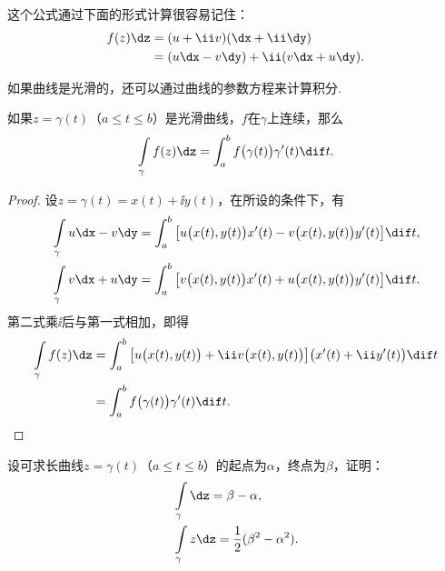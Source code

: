 这个公式通过下面的形式计算很容易记住：
\begin{align*}
f(z)\dz & = (u+\ii v)(\dx+\ii\dy) \\
        & = (u\dx-v\dy)+\ii(v\dx+u\dy).
\end{align*}

如果曲线是光滑的，还可以通过曲线的参数方程来计算积分.
\begin{prop}\label{prop3.1.2}
如果$z=\gamma(t)$（$a\le t\le b$）是光滑曲线，$f$在$\gamma$上连续，那么
\begin{equation}\label{eq3.1.3}
  \int\limits_\gamma f(z)\dz = \int_a^b f\big(\gamma(t)\big)\gamma'(t)\dif t.
\end{equation}
\end{prop}
\begin{proof}
设$z=\gamma(t)=x(t)+\ii y(t)$，在所设的条件下，有
\begin{align*}
  &\int\limits_\gamma u\dx-v\dy = \int_a^b\big[u\big(x(t),y(t)\big)x'(t)-v\big(x(t),y(t)\big)y'(t)\big]\dif t,\\
  &\int\limits_\gamma v\dx+u\dy = \int_a^b\big[v\big(x(t),y(t)\big)x'(t)+u\big(x(t),y(t)\big)y'(t)\big]\dif t.
\end{align*}
第二式乘$\ii$后与第一式相加，即得
\begin{align*}
  \int\limits_\gamma f(z)\dz
  & = \int_a^b \big[u\big(x(t),y(t)\big)+\ii v\big(x(t),y(t)\big)\big]\big(x'(t)+\ii y'(t)\big)\dif t\\
  & = \int_a^b f\big(\gamma(t)\big)\gamma'(t)\dif t.
\end{align*}
\end{proof}
\begin{example}\label{exam3.1.3}
  设可求长曲线$z=\gamma(t)$（$a\le t\le b$）的起点为$\alpha$，终点为$\beta$，证明：
  \begin{align*}
    &\int\limits_\gamma\dz=\beta-\alpha,\\
    &\int\limits_\gamma z\dz=\frac12(\beta^2-\alpha^2).
  \end{align*}
\end{example}
